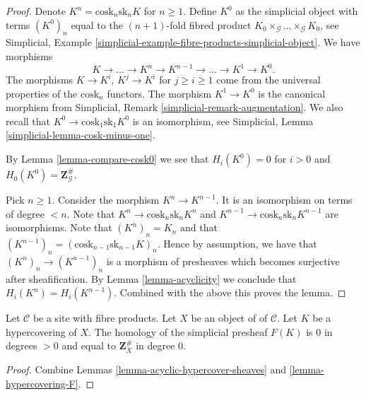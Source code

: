 \begin{proof}
Denote $K^n = \text{cosk}_n \text{sk}_n K$ for $n \geq 1$.
Define $K^0$ as the simplicial object with terms
$(K^0)_n$ equal to the $(n + 1)$-fold fibred product
$K_0 \times_\mathcal{G} \ldots \times_\mathcal{G} K_0$,
see Simplicial,
Example \ref{simplicial-example-fibre-products-simplicial-object}.
We have morphisms
$$
K \longrightarrow \ldots \to K^n \to K^{n - 1} \to \ldots \to K^1 \to K^0.
$$
The morphisms $K \to K^i$, $K^j \to K^i$ for $j \geq i \geq 1$ come
from the universal properties of the $\text{cosk}_n$ functors.
The morphism $K^1 \to K^0$ is the canonical morphism
from
Simplicial, Remark \ref{simplicial-remark-augmentation}.
We also recall that $K^0 \to \text{cosk}_1 \text{sk}_1 K^0$
is an isomorphism, see
Simplicial, Lemma \ref{simplicial-lemma-cosk-minus-one}.

\medskip\noindent
By Lemma \ref{lemma-compare-cosk0} we see that
$H_i(K^0) = 0$ for $i > 0$ and $H_0(K^0) = \mathbf{Z}_\mathcal{G}^\#$.

\medskip\noindent
Pick $n \geq 1$. Consider the morphism $K^n \to K^{n - 1}$.
It is an isomorphism on terms of degree $< n$.
Note that $K^n \to \text{cosk}_n \text{sk}_n K^n$ and
$K^{n - 1} \to \text{cosk}_n \text{sk}_n K^{n - 1}$
are isomorphisms. Note that $(K^n)_n = K_n$ and
that $(K^{n - 1})_n = (\text{cosk}_{n - 1} \text{sk}_{n - 1} K)_n$.
Hence by assumption, we have that $(K^n)_n \to (K^{n - 1})_n$
is a morphism of presheaves which becomes surjective after
sheafification. By Lemma \ref{lemma-acyclicity} we conclude that
$H_i(K^n) = H_i(K^{n - 1})$.
Combined with the above this proves the lemma.
\end{proof}

\begin{lemma}
\label{lemma-hypercovering-acyclic}
Let $\mathcal{C}$ be a site with fibre products.
Let $X$ be an object of of $\mathcal{C}$.
Let $K$ be a hypercovering of $X$.
The homology of the simplicial presheaf $F(K)$ is
$0$ in degrees $> 0$ and equal to $\mathbf{Z}_X^\#$
in degree $0$.
\end{lemma}

\begin{proof}
Combine Lemmas \ref{lemma-acyclic-hypercover-sheaves}
and \ref{lemma-hypercovering-F}.
\end{proof}












